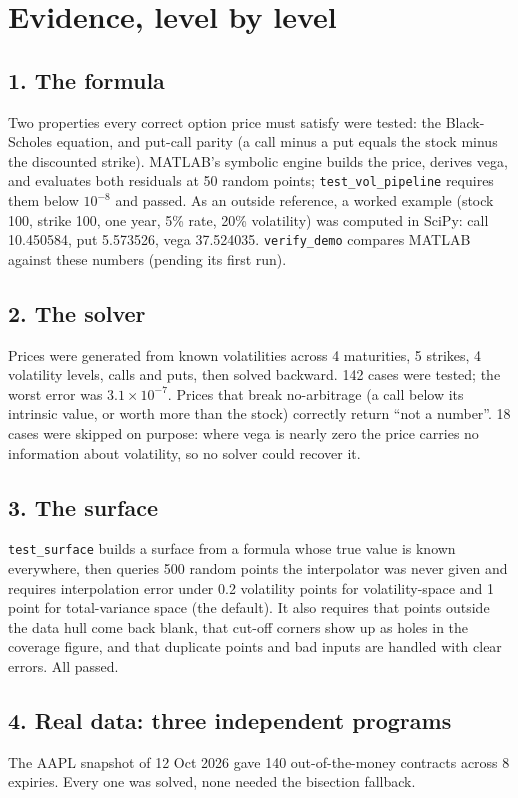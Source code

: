 \documentclass[11pt]{article}
\begin{document}
\section{Evidence, level by level}
\subsection*{1. The formula}
Two properties every correct option price must satisfy were tested: the Black-Scholes equation, and put-call parity (a call minus a put equals the stock minus the discounted strike). MATLAB's symbolic engine builds the price, derives vega, and evaluates both residuals at 50 random points; \texttt{test\_vol\_pipeline} requires them below $10^{-8}$ and passed. As an outside reference, a worked example (stock 100, strike 100, one year, 5\% rate, 20\% volatility) was computed in SciPy: call 10.450584, put 5.573526, vega 37.524035. \texttt{verify\_demo} compares MATLAB against these numbers (pending its first run).

\subsection*{2. The solver}
Prices were generated from known volatilities across 4 maturities, 5 strikes, 4 volatility levels, calls and puts, then solved backward. 142 cases were tested; the worst error was $3.1\times10^{-7}$. Prices that break no-arbitrage (a call below its intrinsic value, or worth more than the stock) correctly return ``not a number''. 18 cases were skipped on purpose: where vega is nearly zero the price carries no information about volatility, so no solver could recover it.

\subsection*{3. The surface}
\texttt{test\_surface} builds a surface from a formula whose true value is known everywhere, then queries 500 random points the interpolator was never given and requires interpolation error under 0.2 volatility points for volatility-space and 1 point for total-variance space (the default). It also requires that points outside the data hull come back blank, that cut-off corners show up as holes in the coverage figure, and that duplicate points and bad inputs are handled with clear errors. All passed.

\subsection*{4. Real data: three independent programs}
The AAPL snapshot of 12 Oct 2026 gave 140 out-of-the-money contracts across 8 expiries. Every one was solved, none needed the bisection fallback.
\end{document}
